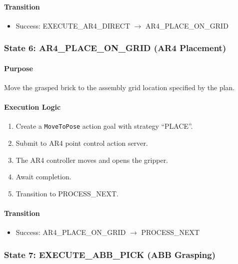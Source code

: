 \paragraph{Transition}

\begin{itemize}
    \item Success: EXECUTE\_AR4\_DIRECT $\rightarrow$ AR4\_PLACE\_ON\_GRID
\end{itemize}

\subsubsection{State 6: AR4\_PLACE\_ON\_GRID (AR4 Placement)}
\label{state:ar4place}

\paragraph{Purpose}

Move the grasped brick to the assembly grid location specified by the plan.

\paragraph{Execution Logic}

\begin{enumerate}
    \item Create a \texttt{MoveToPose} action goal with strategy ``PLACE''.
    \item Submit to AR4 point control action server.
    \item The AR4 controller moves and opens the gripper.
    \item Await completion.
    \item Transition to PROCESS\_NEXT.
\end{enumerate}

\paragraph{Transition}

\begin{itemize}
    \item Success: AR4\_PLACE\_ON\_GRID $\rightarrow$ PROCESS\_NEXT
\end{itemize}

\subsubsection{State 7: EXECUTE\_ABB\_PICK (ABB Grasping)}
\label{state:executeABBpick}

